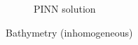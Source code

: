 \begin{frame}
\begin{figure}
\begin{subfigure}[b]{0.45\textwidth}
            \caption{PINN solution}
            \label{fig:17_inhomogeneous_pinn_swe_bathymetry}
        \end{subfigure}
        \caption{Bathymetry (inhomogeneous)}
        \label{fig:17_inhomogeneous_bathymetry}
    \end{figure}
\end{frame}